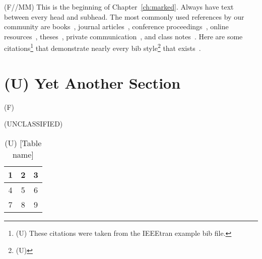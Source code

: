 (F//MM) This is the beginning of Chapter~\ref{ch:marked}. Always have text
between every head and subhead. The most commonly used references by our
community are
   books~\cite{IEEEexample:book_typical},
   journal articles~\cite{IEEEexample:article_typical},
   conference proceedings~\cite{IEEEexample:conf_typical},
   online resources~\cite{IEEEhowto:IEEEtranpage},
   theses~\cite{IEEEexample:masters},
   private communication~\cite{IEEEexample:private}, and
   class notes~\cite{NPSexample:notes}.
Here are some citations\footnote{(U) These citations were taken
from the IEEEtran example bib file.} that demonstrate nearly every bib 
style\footnote{(U) \lipsum[10]} that exists~\cite{IEEEhowto:IEEEtranpage,
IEEEexample:shellCTANpage,IEEEexample:bibtexuser,IEEEexample:bibtexdesign,
IEEEexample:tamethebeast,IEEEexample:bibtexguide,
IEEEexample:article_typical,IEEEexample:articleetal,IEEEexample:conf_typical,
IEEEexample:book_typical,IEEEexample:articlelargepages,
IEEEexample:articledualmonths,IEEEexample:TBParticle,
IEEEexample:bookwitheditor,IEEEexample:book,IEEEexample:bookwithseriesvolume,
IEEEexample:inbook,IEEEexample:inbookpagesnote,IEEEexample:incollection,
IEEEexample:incollectionwithseries,IEEEexample:incollection_chpp,
IEEEexample:incollectionmanyauthors,
IEEEexample:motmanualhowpub,IEEEexample:confwithadddays,
IEEEexample:confwithvolume,IEEEexample:confwithpaper,
IEEEexample:confwithpapertype,IEEEexample:presentedatconf,
IEEEexample:masters,IEEEexample:masterstype,IEEEexample:phdurl,
IEEEexample:techrep,IEEEexample:techreptype,IEEEexample:techreptypeii,
IEEEexample:techrepstdsub,IEEEexample:unpublished,IEEEexample:electronhowinfo,
IEEEexample:electronhowinfo2,IEEEexample:electronorgadd,IEEEexample:uspat,
IEEEexample:jppat,IEEEexample:frenchpatreq,
IEEEexample:standard,IEEEexample:standardproposed,IEEEexample:draftasmisc,
IEEEexample:miscforum,IEEEexample:whitepaper,IEEEexample:datasheet,
IEEEexample:private,IEEEexample:miscrfc,IEEEexample:softmanual,
IEEEexample:softonline,IEEEexample:miscgermanreg,IEEEexample:bluebookstandard
}.

\section{(U) Yet Another Section}\label{sec:marked_something}

(F) \lipsum[1]

\begin{table}
\begin{smarkenv}[\textwidth]{(UNCLASSIFIED)}
\centering
\begin{tabular}{ | c | c | c | }
\hline
  1 & 2 & 3 \\ \hline\hline
  4 & 5 & 6 \\
  7 & 8 & 9 \\
\hline
\end{tabular}\vspace{4pt}
\end{smarkenv}
\caption{(U) [Table name]}
\end{table}